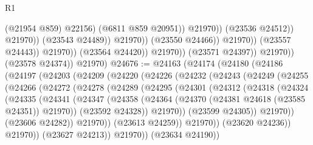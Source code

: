 \begin{lexlean}{R1}
\begin{coremodule}
                                                    (@21954 @859)
                                                    @22156)
                                                  (@6811 @859 @20951))
                                                @21970))
                                            (@23536 @24512))
                                          @21970))
                                      (@23543 @24489))
                                    @21970))
                                (@23550 @24466))
                              @21970))
                          (@23557 @24443))
                        @21970))
                    (@23564 @24420))
                  @21970))
              (@23571 @24397))
            @21970))
        (@23578 @24374))
      @21970)
@24676 := @24163
    (@24174
      (@24180
        (@24186
          (@24197
            (@24203
              (@24209
                (@24220
                  (@24226
                    (@24232
                      (@24243
                        (@24249
                          (@24255
                            (@24266
                              (@24272
                                (@24278
                                  (@24289
                                    (@24295
                                      (@24301
                                        (@24312
                                          (@24318
                                            (@24324
                                              (@24335
                                                (@24341
                                                  (@24347
                                                    (@24358
                                                      (@24364
                                                        (@24370
                                                          (@24381 @24618 (@23585 @24351))
                                                          @21970))
                                                      (@23592 @24328))
                                                    @21970))
                                                (@23599 @24305))
                                              @21970))
                                          (@23606 @24282))
                                        @21970))
                                    (@23613 @24259))
                                  @21970))
                              (@23620 @24236))
                            @21970))
                        (@23627 @24213))
                      @21970))
                  (@23634 @24190))

\end{coremodule}
\end{lexlean}

